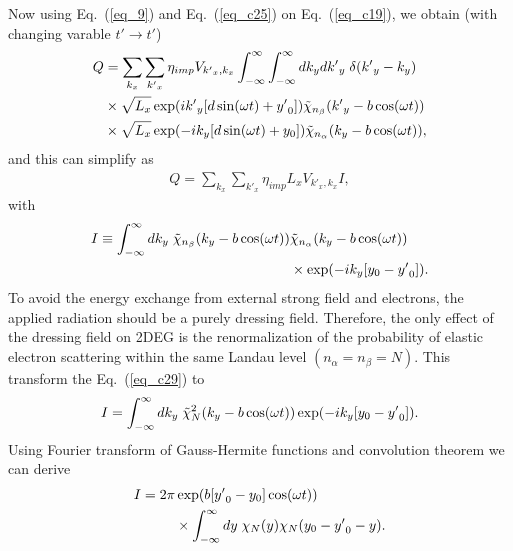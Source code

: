 Now using Eq.~(\ref{eq_9}) and Eq.~(\ref{eq_c25}) on Eq.~(\ref{eq_c19}), we obtain (with changing varable $t' \rightarrow t'$)
\begin{equation} \label{eq_c27}
  \begin{aligned}
    Q & =
    \sum_{k_x}\sum_{{k'}_x}
    {\eta_{imp} V_{{k'}_x,k_x}}
    \int_{-\infty}^{\infty} \int_{-\infty}^{\infty} dk_y d{k'}_y \;
    \delta({k'}_y - k_y)
    \\
    & \times
    \sqrt{L_x}
    \exp(
      i{k'}_y  \qty[d\sin(\omega t) + {y'}_0]
    )
    \tilde{\chi}_{n_{\beta}}\qty({k'}_y -b\cos(\omega t))
    \\
    & \times
    \sqrt{L_x}
    \exp(
      -ik_y  \qty[d\sin(\omega t) + y_0]
    )
    \tilde{\chi}_{n_{\alpha}}\qty(k_y -b\cos(\omega t)),
  \end{aligned}
\end{equation}
and this can simplify as
\begin{equation} \label{eq_c28}
  \begin{aligned}
    Q =
    \sum_{k_x}\sum_{{k'}_x}
    {\eta_{imp} L_x V_{{k'}_x,k_x}} I,
  \end{aligned}
\end{equation}
with
\begin{equation} \label{eq_c29}
  \begin{aligned}
    I \equiv
    \int_{-\infty}^{\infty} dk_y \;
    \tilde{\chi}_{n_{\beta}}\qty(k_y -b\cos(\omega t)) &
    \tilde{\chi}_{n_{\alpha}}\qty(k_y -b\cos(\omega t)) \\
    & \times
    \exp(
      -ik_y  \qty[y_0 - {y'}_0  ]
    ).
  \end{aligned}
\end{equation}
To avoid the energy exchange from external strong field and electrons, the applied radiation should be a purely dressing field. Therefore, the only effect of the dressing field on 2DEG is the renormalization of the probability of elastic electron scattering within the same Landau level $(n_{\alpha} = n_{\beta} =N)$. This transform the Eq.~(\ref{eq_c29}) to
\begin{equation} \label{eq_c30}
    I =
    \int_{-\infty}^{\infty} dk_y \;
    \tilde{\chi}_{N}^2 \qty(k_y -b\cos(\omega t))
    \exp(
      -ik_y  \qty[y_0 - {y'}_0  ]
    ).
\end{equation}
Using Fourier transform of Gauss-Hermite functions \cite{celeghini21} and convolution theorem \cite{arfken85,bracewell78} we can derive
\begin{equation} \label{eq_c31}
  \begin{aligned}
    I =
    {2\pi} &
    \exp(b[{y'}_0 - y_0]\cos(\omega t)) \\
    & \times
    \int_{-\infty}^{\infty} dy \;
    {\chi}_{N}\qty(y)
    {\chi}_{N}\qty(y_0 - {y'}_0 - y).
  \end{aligned}
\end{equation}
